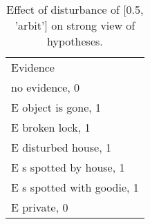 \begin{table}\begin{tabular}{l}\toprule\multirow{2}{*}{Evidence} \\\\\midrule
no evidence, 0 & \\E object is gone, 1 & \\E broken lock, 1 & \\E disturbed house, 1 & \\E s spotted by house, 1 & \\E s spotted with goodie, 1 & \\E private, 0 & \\\bottomrule\end{tabular}\caption{Effect of disturbance of [0.5, 'arbit'] on strong view of hypotheses.}\end{table}